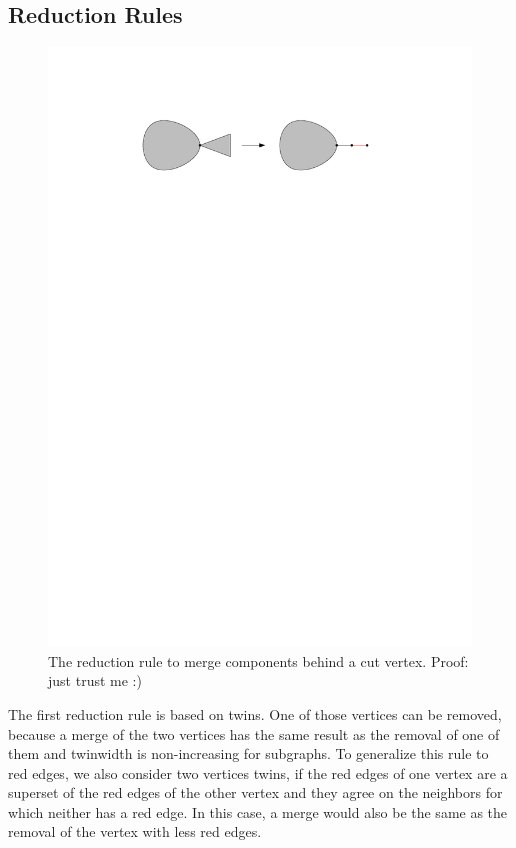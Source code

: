 \documentclass[a4paper,UKenglish,cleveref, autoref, thm-restate]{lipics-v2021}
\begin{document}
\subsection{Reduction Rules}
\begin{figure}
\centering
\includegraphics{cut}
\caption{The reduction rule to merge components behind a cut vertex. Proof: just trust me :)}
\label{fig:cut}
\end{figure}
The first reduction rule is based on twins.
One of those vertices can be removed, because a merge of the two vertices has the same result as the removal of one of them and twinwidth is non-increasing for subgraphs.
To generalize this rule to red edges, we also consider two vertices twins, if the red edges of one vertex are a superset of the red edges of the other vertex and they agree on the neighbors for which neither has a red edge.
In this case, a merge would also be the same as the removal of the vertex with less red edges.
\end{document}
